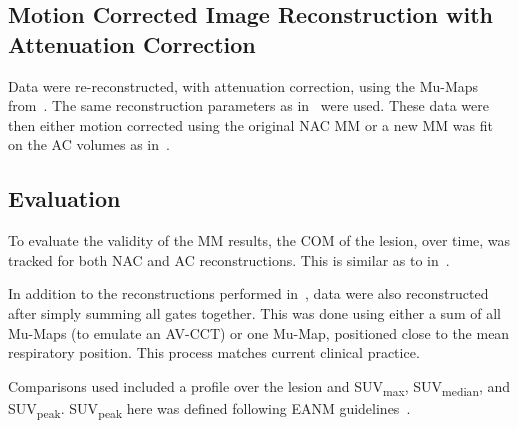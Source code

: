             \subsection{Motion Corrected Image Reconstruction with Attenuation Correction} \label{sec:pet_ct_respiratory_motion_correction_with_a_single_attenuation_map_using_nac_derived_deformation_fields_methods_attenuation_corrected_image_reconstruction}
                Data were re-reconstructed, with attenuation correction, using the \glspl{Mu-Map} from~. The same reconstruction parameters as in~ were used. These data were then either motion corrected using the original \gls{NAC} \gls{MM} or a new \gls{MM} was fit on the \gls{AC} volumes as in~.
            
            \subsection{Evaluation} \label{sec:pet_ct_respiratory_motion_correction_with_a_single_attenuation_map_using_nac_derived_deformation_fields_methods_evaluation}
                To evaluate the validity of the \gls{MM} results, the \gls{COM} of the lesion, over time, was tracked for both \gls{NAC} and \gls{AC} reconstructions. This is similar as to in~.
                
                In addition to the reconstructions performed in~, data were also reconstructed after simply summing all gates together. This was done using either a sum of all \glspl{Mu-Map} (to emulate an \gls{AV-CCT}) or one \gls{Mu-Map}, positioned close to the mean respiratory position. This process matches current clinical practice. 
                
                Comparisons used included a profile over the lesion and \gls{SUV}\textsubscript{max}, \gls{SUV}\textsubscript{median}, and \gls{SUV}\textsubscript{peak}. \gls{SUV}\textsubscript{peak} here was defined following \gls{EANM} guidelines~\parencite{Boellaard2015FDG2.0}.
            
